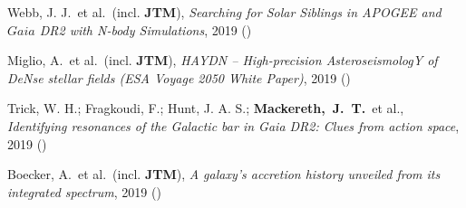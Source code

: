 \item[{\scriptsize4}]Webb, J. J.~et al.~(incl. \textbf{JTM}), \textit{Searching for Solar Siblings in APOGEE and $Gaia$ DR2 with N-body Simulations}, 2019 ()

\item[{\scriptsize3}]Miglio, A.~et al.~(incl. \textbf{JTM}), \textit{HAYDN -- High-precision AsteroseismologY of DeNse stellar fields (ESA Voyage 2050 White Paper)}, 2019 ()

\item[{\scriptsize2}]Trick, W. H.; Fragkoudi, F.; Hunt, J. A. S.; \textbf{Mackereth,~J.~T.}~et al., \textit{Identifying resonances of the Galactic bar in Gaia DR2: Clues from action space}, 2019 ()

\item[{\scriptsize1}]Boecker, A.~et al.~(incl. \textbf{JTM}), \textit{A galaxy's accretion history unveiled from its integrated spectrum}, 2019 ()